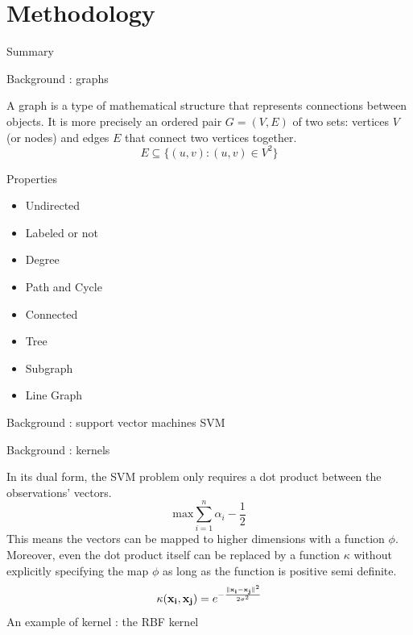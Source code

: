 \documentclass[compress]{beamer}
\DeclarePairedDelimiter{\norm}{\lVert}{\rVert}
\let\vec\mathbf
\begin{document}
\section{Methodology}
\begin{frame}{Summary}
  \tableofcontents[currentsection]
\end{frame}
\begin{frame}{Background : graphs}
\begin{definition}
	A graph\cite{bondy1976graph} is a type of mathematical structure that represents connections between objects. It is more precisely an ordered pair $G=(V,E)$ of two sets: vertices $V$ (or nodes) and edges $E$ that connect two vertices together.
	\begin{equation*}
	E \subseteq \{(u,v) : (u,v) \in V^2\}
	\end{equation*}
\end{definition}
\begin{block}{Properties}
	\begin{multicols}{2}
		\begin{itemize}
			\item Undirected
			\item Labeled or not
			\item Degree
			\item Path and Cycle
		\end{itemize}
		\begin{itemize}
			\item Connected
			\item Tree
			\item Subgraph
			\item Line Graph
		\end{itemize}
	\end{multicols}
\end{block}
\end{frame}
\begin{frame}{Background : support vector machines}
	SVM
\end{frame}
\begin{frame}{Background : kernels}
	\begin{definition}
		In its dual form, the SVM problem only requires a dot product between the observations' vectors. 
		\begin{equation*}
		\text{max} \sum\limits_{i=1}^{n} \alpha_i - \frac{1}{2} 
		\end{equation*}
		This means the vectors can be mapped to higher dimensions with a function $\phi$. Moreover, even the dot product itself can be replaced by a function $\kappa$ without explicitly specifying the map $\phi$ as long as the function is positive semi definite.
		\begin{equation*}
		\kappa(\vec{x_{i}},\vec{x_{j}})={e}^{-\frac{\norm{\vec{x_{i}}-\vec{x_{j}}}^{2}}{2\sigma^{2}}}
		\end{equation*}
		\centering
		An example of kernel : the RBF kernel
	\end{definition}
\end{frame}
\end{document}
